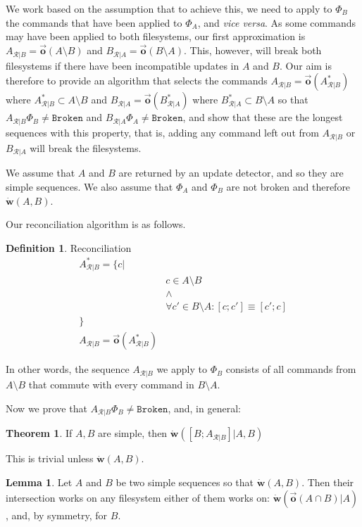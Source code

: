 \documentclass[12pt]{article}
\newcommand{\fsbroken}{\mathtt{Broken}} %
\newcommand{\FS}{\Phi} %
\newcommand{\works}[1]{\dot{\mathbf{w}}({#1})}
\newcommand{\worksc}[2]{\dot{\mathbf{w}}({#1}|{#2})}
\newcommand{\ordered}[1]{\vec{\mathbf{o}}({#1})}
\newcommand{\recchar}[3]{{#1}^{#3}_{\mathcal{R}|{#2}}}
\newcommand{\reca}{\recchar{A}{B}{}} %
\newcommand{\recb}{\recchar{B}{A}{}}
\newcommand{\recaset}{\recchar{A}{B}{*}}
\newcommand{\recbset}{\recchar{B}{A}{*}}
\theoremstyle{definition}
\newtheorem{mydef}{Definition}
\newtheorem{mylem}{Lemma}
\newtheorem{myth}{Theorem}
\begin{document}
We work based on the assumption that to achieve this, we need
to apply to $\FS_B$ the commands that have been applied to $\FS_A$, and \emph{vice versa}.
As some commands may have been applied to both filesystems, our first approximation
is $\reca = \ordered{A\setminus B}$ and $\recb = \ordered{B\setminus A}$.
This, however, will break both filesystems if there have been incompatible updates
in $A$ and $B$. 
Our aim is therefore to provide an algorithm that selects the commands 
$\reca = \ordered{\recaset}$  where $\recaset \subset A\setminus B$
and $\recb = \ordered{\recbset}$ where $\recbset \subset B\setminus A$ 
so that $\reca\FS_B\neq\fsbroken$ and $\recb\FS_A\neq\fsbroken$,
and show that these are the longest sequences with this property, that is,
adding any command left out from $\reca$ or $\recb$ will break the filesystems.

We assume that $A$ and $B$ are returned by an update detector,
and so they are simple sequences.
We also assume that $\FS_A$ and $\FS_B$ are not broken and therefore $\works{A,B}$.

Our reconciliation algorithm is as follows.

\begin{mydef}{Reconciliation}\label{def:reconciliation}
\begin{align*}
\recaset = \{c| & \\
& c\in A\setminus B \\
& \wedge \\
& \forall c'\in B\setminus A: [c;c']\equiv[c';c]\\
\} & \\
\reca = \ordered{\recaset}&
\end{align*}

In other words, the sequence $\reca$ we apply to $\FS_B$ consists of all commands from $A\setminus B$
that commute with every command in $B\setminus A$.
\end{mydef}

Now we prove that $\reca\FS_B\neq\fsbroken$, and, in general:

\begin{myth}
If $A, B$ are simple, then $\worksc{[B;\reca]}{A,B}$
\end{myth}

This is trivial unless $\works{A,B}$.

\begin{mylem}
Let $A$ and $B$ be two simple sequences so that $\works{A, B}$.
Then their intersection works on any filesystem
either of them works on:
$\worksc{\ordered{A\cap B}}{A}$, and, by symmetry, for $B$.
\end{mylem}
\end{document}
